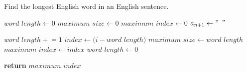 \documentclass[a4paper, 12pt]{article}
\newcommand{\pluseq}{\mathrel{+}=}
\begin{document}
	
	\begin{algorithm}

		\renewcommand{\thealgorithm}{3.1.22}
		
		\caption{Find the longest English word in an English sentence.}
		
		\begin{algorithmic}[1]
			
			
			\State $word$ $length \gets 0$
			\State $maximum$ $size \gets 0$
			\State $maximum$ $index \gets 0$
			\State $a_{n+1} \gets "$ $"$
			
				 
					\State $word$ $length \pluseq 1$
				\Else {}
					\State $index \gets (i - word$ $length)$ 
						\State $maximum$ $size \gets word$ $length$
						\State $maximum$ $index \gets index$
					\EndIf
					\State $word$ $length \gets 0$
				\EndIf
			\EndFor
			
			\State \textbf{return} $maximum$ $index$
			\EndProcedure
			
		\end{algorithmic}

	\end{algorithm}
\end{document}

